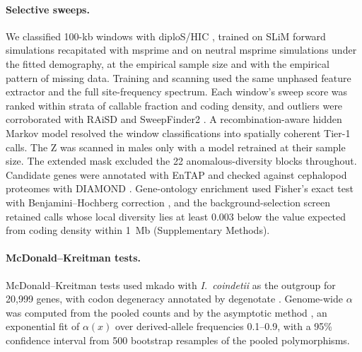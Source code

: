\documentclass[11pt]{article}
\newcommand{\coin}{\textit{I.\ coindetii}}
\begin{document}
\paragraph{Selective sweeps.}
We classified 100-kb windows with diploS/HIC \citep{kern2018diploshic}, trained on SLiM forward simulations
\citep{haller2019slim} recapitated with msprime \citep{baumdicker2022,haller2019recap} and on neutral msprime
simulations under the fitted demography, at the empirical sample size and with the empirical pattern of missing
data. Training and scanning used the same unphased feature extractor and the full site-frequency spectrum. Each
window's sweep score was ranked within strata of callable fraction and coding density, and outliers were
corroborated with RAiSD \citep{alachiotis2018raisd} and SweepFinder2 \citep{degiorgio2016}. A
recombination-aware hidden Markov model resolved the window classifications into spatially coherent Tier-1
calls. The Z was scanned in males only with a model retrained at their sample size. The extended mask excluded the 22 anomalous-diversity blocks throughout. Candidate genes were annotated with EnTAP
\citep{hart2020entap} and checked against cephalopod proteomes with DIAMOND \citep{buchfink2021diamond}.
Gene-ontology enrichment used Fisher's exact test with Benjamini--Hochberg correction \citep{benjamini1995}, and
the background-selection screen retained calls whose local diversity lies at least 0.003 below the value expected from coding density within 1~Mb (Supplementary Methods).

\paragraph{McDonald--Kreitman tests.}
McDonald--Kreitman tests used mkado \citep{mkado} with \coin{} as the outgroup for 20{,}999 genes, with codon
degeneracy annotated by degenotate \citep{degenotate}. Genome-wide $\alpha$ was computed from the pooled counts and by the asymptotic method \citep{messer2013mk}, an exponential fit of $\alpha(x)$ over derived-allele frequencies 0.1--0.9, with a 95\% confidence interval from 500 bootstrap resamples of the pooled polymorphisms.

\end{document}
